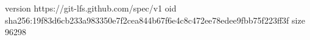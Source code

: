 version https://git-lfs.github.com/spec/v1
oid sha256:19f83d6cb233a983350e7f2cea844b67f6e4c8c472ee78edee9fbb75f223ff3f
size 96298
